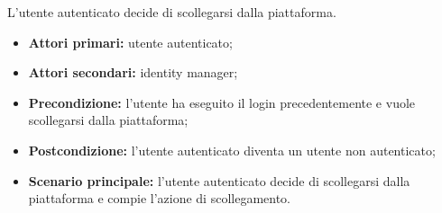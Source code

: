 \label{logout}

L'utente autenticato decide di scollegarsi dalla piattaforma.
\begin{itemize}
    \item \textbf{Attori primari:} utente autenticato;
    \item \textbf{Attori secondari:} identity manager;
    \item \textbf{Precondizione:} l'utente ha eseguito il login precedentemente e vuole scollegarsi dalla piattaforma;
    \item \textbf{Postcondizione:} l'utente autenticato diventa un utente non autenticato;
    \item \textbf{Scenario principale:} l'utente autenticato decide di scollegarsi dalla piattaforma e compie l'azione di scollegamento.
\end{itemize}
